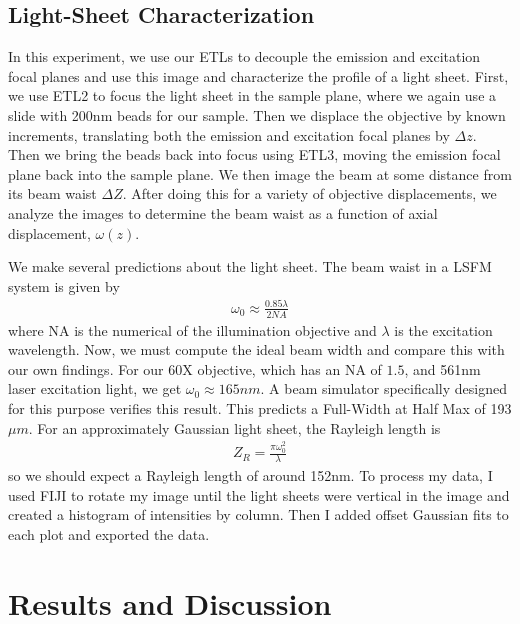 \subsection{Light-Sheet Characterization}
In this experiment, we use our ETLs to decouple the emission and excitation focal planes and use this image and characterize the profile of a light sheet. First, we use ETL2 to focus the light sheet in the sample plane, where we again use a slide with 200nm beads for our sample. Then we displace the objective by known increments, translating both the emission and excitation focal planes by $\Delta z$. Then we bring the beads back into focus using ETL3, moving the emission focal plane back into the sample plane. We then image the beam at some distance from its beam waist $\Delta Z.$ After doing this for a variety of objective displacements, we analyze the images to determine the beam waist as a function of axial displacement, $\omega(z)$. \par
We make several predictions about the light sheet. The beam waist in a LSFM system is given by \cite{Ernst}
\begin{gather}
    \omega_0 \approx \frac{0.85 \lambda}{2 NA}
\end{gather}
where NA is the numerical of the illumination objective and $\lambda$ is the excitation wavelength. Now, we must compute the ideal beam width and compare this with our own findings. For our 60X objective, which has an NA of $1.5$, and 561nm laser excitation light, we get $\omega_0 \approx 165nm.$ A beam simulator specifically designed for this purpose \cite{Remacha} verifies this result. This predicts a Full-Width at Half Max of 193$\mu m$. For an approximately Gaussian light sheet, the Rayleigh length is
\begin{gather}
	Z_R = \frac{\pi \omega_0^2}{\lambda}
\end{gather}
so we should expect a Rayleigh length of around 152nm. To process my data, I used FIJI \cite{Fiji} to rotate my image until the light sheets were vertical in the image and created a histogram of intensities by column. Then I added offset Gaussian fits to each plot and exported the data.
\section{Results and Discussion}
